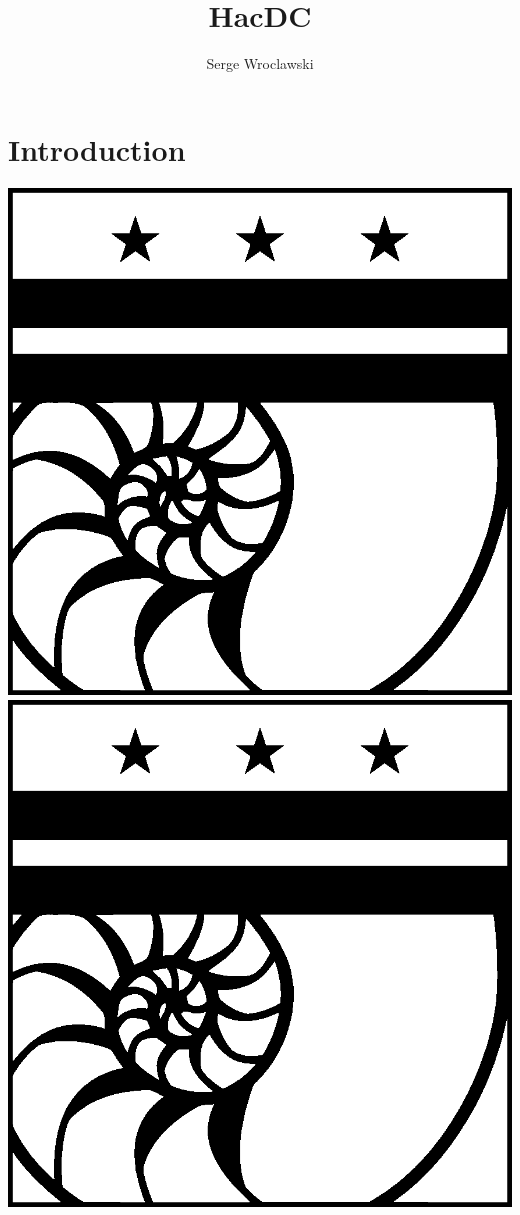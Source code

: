 \documentclass[notes]{beamer}
\title{HacDC}
\author{Serge Wroclawski}
\begin{document}
\section{Introduction}

\begin{frame}
        \titlepage
        \vfill
        \begin{center}
                \includegraphics{hacdc-logo}
                \\[2.5ex]
                {\tiny\CcNote{\CcLongnameBySa}}
                \vspace*{-2.5ex}
                \includegraphics{hacdc-logo}
        \end{center}
\end{frame}
\end{document}
